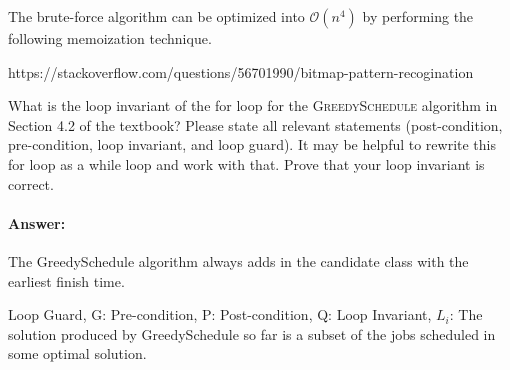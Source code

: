 \documentclass{article}
\begin{document}
The brute-force algorithm can be optimized into $\mathcal{O}(n^4)$ by performing the following memoization technique.

https://stackoverflow.com/questions/56701990/bitmap-pattern-recogination


\collab{\todo{}}

What is the loop invariant of the for loop for the \textsc{GreedySchedule}
algorithm in Section 4.2 of the textbook?  Please state all relevant statements
(post-condition, pre-condition, loop invariant, and loop guard).  It may be
helpful to rewrite this for loop as a while loop and work with that.  Prove that
your loop invariant is correct.

\paragraph{Answer: }

The GreedySchedule algorithm always adds in the candidate class with the earliest finish time.

Loop Guard, G:
Pre-condition, P: 
Post-condition, Q: 
Loop Invariant, $L_i$: The solution produced by GreedySchedule so far is a subset of the jobs scheduled in some optimal solution.
\end{document}
